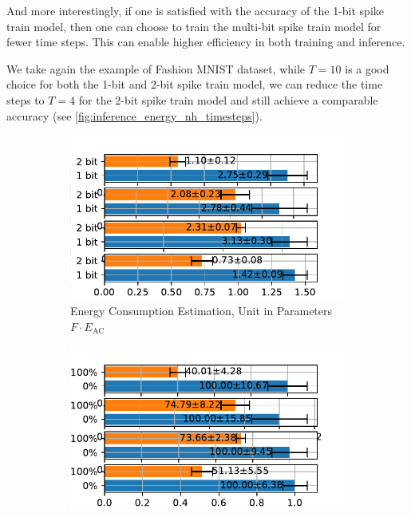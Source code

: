         And more interestingly, if one is satisfied with the accuracy of the 1-bit spike train model, then one can choose to train the multi-bit spike train model for fewer time steps. This can enable higher efficiency in both training and inference. 

        We take again the example of Fashion MNIST dataset, while $T=10$ is a good choice for both the 1-bit and 2-bit spike train model, we can reduce the time steps to $T=4$ for the 2-bit spike train model and still achieve a comparable accuracy (see \ref{fig:inference_energy_nh_timesteps}). 
        \begin{figure}[!htpb]
            \centering
            \begin{subfigure}[H]{0.48\textwidth}
                \includegraphics[width=\textwidth]{../timesteps/FashionMNIST/plots/fashionmnist_test_energy_nh.pdf}
                \caption{Energy Consumption Estimation, Unit in Parameters $F\cdot E_{\text{AC}}$}
            \end{subfigure}
            \hfill
            \begin{subfigure}[H]{0.48\textwidth}
                \includegraphics[width=\textwidth]{../timesteps/FashionMNIST/plots/fashionmnist_test_relative_energy_nh.pdf}

\end{subfigure}
\end{figure}
